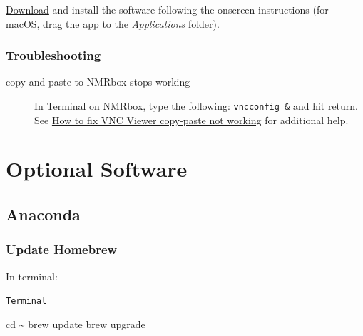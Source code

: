 \documentclass[
  letterpaper,
  DIV=11,
  numbers=noendperiod]{scrreprt}
\newenvironment{Shaded}{\begin{snugshade}}{\end{snugshade}}
\newcommand{\BuiltInTok}[1]{\textcolor[rgb]{0.00,0.23,0.31}{#1}}
\newcommand{\ExtensionTok}[1]{\textcolor[rgb]{0.00,0.23,0.31}{#1}}
\newcommand{\NormalTok}[1]{\textcolor[rgb]{0.00,0.23,0.31}{#1}}
\newcommand*\circled[1]{\tikz[baseline=(char.base)]{
          \node[shape=circle,draw,inner sep=1pt] (char) {{\scriptsize#1}};}}
\begin{document}
\href{https://www.realvnc.com/en/connect/download/viewer/}{Download} and
install the software following the onscreen instructions (for macOS,
drag the app to the \emph{Applications} folder).

\subsubsection{Troubleshooting}\label{troubleshooting}

\begin{description}
\item[copy and paste to NMRbox stops working]
In Terminal on NMRbox, type the following: \texttt{vncconfig\ \&} and
hit return. See
\href{https://www.anyviewer.com/how-to/vnc-viewer-copy-paste-2578.html}{How
to fix VNC Viewer copy-paste not working} for additional help.
\end{description}

\section{Optional Software}\label{optional-software}

\subsection{Anaconda}\label{anaconda}

\subsubsection{Update Homebrew}\label{update-homebrew}

In terminal:

\begin{codelisting}

\caption{\texttt{Terminal}}

\label{annotated-cell-10}%
\begin{Shaded}
\begin{Highlighting}[]
\BuiltInTok{cd}\NormalTok{ \textasciitilde{}}
\ExtensionTok{brew}\NormalTok{ update }\hspace*{\fill}\NormalTok{\circled{1}}
\ExtensionTok{brew}\NormalTok{ upgrade }\hspace*{\fill}\NormalTok{\circled{2}}
\end{Highlighting}
\end{Shaded}

\end{codelisting}
\end{document}
